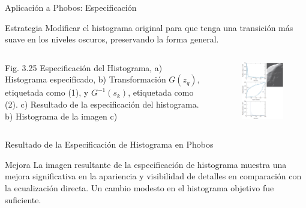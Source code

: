 \documentclass{beamer}
\begin{document}
\begin{frame}{Aplicación a Phobos: Especificación}\footnotesize
    \begin{block}{\footnotesize Estrategia}
        Modificar el histograma original para que tenga una transición más suave en los niveles oscuros, preservando la forma general.
    \end{block}
    \begin{columns}[T]
        \begin{column}{0.3\textwidth}
            Fig. 3.25 Especificación del Histograma, a) Histograma especificado, b) Transformación $G(z_{q})$, etiquetada como (1), y $G^{-1}(s_{k})$, etiquetada como (2). c) Resultado de la especificación del histograma. b) Histograma de la imagen c)
        \end{column}
        \begin{column}{0.7\textwidth}
            \begin{figure}
                \includegraphics[width=0.5\linewidth]{figuras/Fig_3_25.png}
           \end{figure}
        \end{column}
    \end{columns}
\end{frame}

\begin{frame}{Resultado de la Especificación de Histograma en Phobos}
    \begin{block}{Mejora}
        La imagen resultante de la especificación de histograma muestra una mejora significativa en la apariencia y visibilidad de detalles en comparación con la ecualización directa. Un cambio modesto en el histograma objetivo fue suficiente.
    \end{block}
\end{frame}
\end{document}
